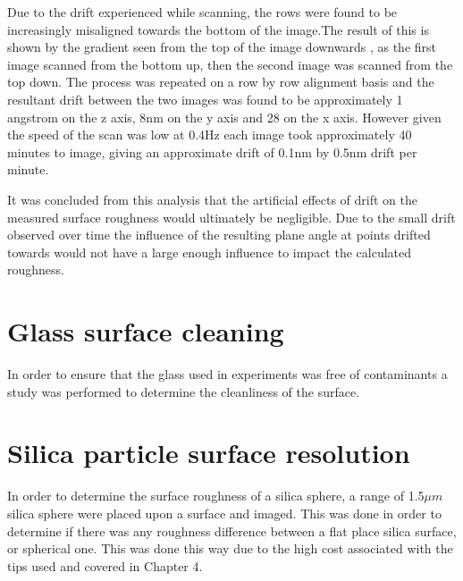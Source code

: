 Due to the drift experienced while scanning, the rows were found to be increasingly misaligned towards the bottom of the image.The result of this is shown by the gradient seen from the top of the image downwards , as the first image scanned from the bottom up, then the second image was scanned from the top down. The process was repeated on a row by row alignment basis and the resultant drift between the two images was found to be approximately 1 angstrom on the z axis, 8nm on the y axis and 28 on the x axis. However given the speed of the scan was low at 0.4Hz each image took approximately 40 minutes to image, giving an approximate drift of 0.1nm by 0.5nm drift per minute.

It was concluded from this analysis that the artificial effects of drift on the measured surface roughness would ultimately be negligible. Due to the small drift observed over time the influence of the resulting plane angle at points drifted towards would not have a large enough influence to impact the calculated roughness.




\section{Glass surface cleaning}

In order to ensure that the glass used in experiments was free of contaminants a study was performed to determine the cleanliness of the surface.




\section{Silica particle surface resolution} %

In order to determine the surface roughness of a silica sphere, a range of 1.5$\mu m$ silica sphere were placed upon a surface and imaged. This was done in order to determine if there was any roughness difference between a flat place silica surface, or spherical one. This was done this way due to the high cost associated with the tips used and covered in Chapter 4.

